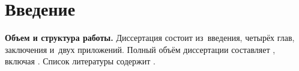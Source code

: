 \chapter*{Введение}							%

\newcommand{\actuality}{}
\newcommand{\progress}{}
\newcommand{\aim}{{\textbf\aimTXT}}
\newcommand{\tasks}{\textbf{\tasksTXT}}
\newcommand{\novelty}{\textbf{\noveltyTXT}}
\newcommand{\influence}{\textbf{\influenceTXT}}
\newcommand{\methods}{\textbf{\methodsTXT}}
\newcommand{\defpositions}{\textbf{\defpositionsTXT}}
\newcommand{\reliability}{\textbf{\reliabilityTXT}}
\newcommand{\probation}{\textbf{\probationTXT}}
\newcommand{\contribution}{\textbf{\contributionTXT}}
\newcommand{\publications}{\textbf{\publicationsTXT}}


\textbf{Объем и структура работы.} Диссертация состоит из~введения, четырёх глав, заключения и~двух приложений.
%
Полный объём диссертации составляет
, включая
.   Список литературы содержит  
.

\insertbiblioauthor
